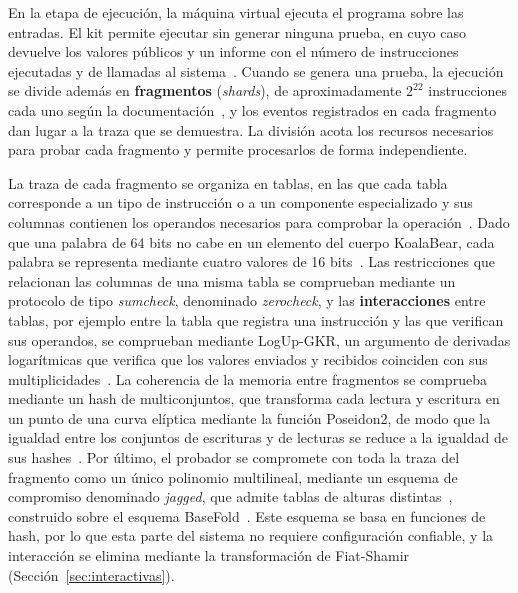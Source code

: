 En la etapa de ejecución, la máquina virtual ejecuta el programa sobre las entradas. El kit
permite ejecutar sin generar ninguna prueba, en cuyo caso devuelve los valores públicos y un
informe con el número de instrucciones ejecutadas y de llamadas al sistema~\cite{sp1repo}. Cuando
se genera una prueba, la ejecución se divide además en \textbf{fragmentos} (\textit{shards}), de
aproximadamente $2^{22}$ instrucciones cada uno según la documentación~\cite{sp1docsv6}, y los
eventos registrados en cada fragmento dan lugar a la traza que se demuestra. La división acota los
recursos necesarios para probar cada fragmento y permite procesarlos de forma independiente.

La traza de cada fragmento se organiza en tablas, en las que cada tabla corresponde a un tipo de
instrucción o a un componente especializado y sus columnas contienen los operandos necesarios para
comprobar la operación~\cite{sp1docsv6}. Dado que una palabra de 64 bits no cabe en un elemento del
cuerpo KoalaBear, cada palabra se representa mediante cuatro valores de 16 bits~\cite{sp1repo}. Las
restricciones que relacionan las columnas de una misma tabla se comprueban mediante un protocolo de
tipo \textit{sumcheck}, denominado \textit{zerocheck}, y las \textbf{interacciones} entre tablas, por
ejemplo entre la tabla que registra una instrucción y las que verifican sus operandos, se comprueban
mediante LogUp-GKR, un argumento de derivadas logarítmicas que verifica que los valores enviados y
recibidos coinciden con sus multiplicidades~\cite{sp1docsv6, papini2023logupgkr}. La coherencia de
la memoria entre fragmentos se comprueba mediante un hash de multiconjuntos, que transforma cada
lectura y escritura en un punto de una curva elíptica mediante la función Poseidon2, de modo que la
igualdad entre los conjuntos de escrituras y de lecturas se reduce a la igualdad de sus
hashes~\cite{sp1docsv6}. Por último, el probador se compromete con toda la traza del fragmento como
un único polinomio multilineal, mediante un esquema de compromiso denominado \textit{jagged}, que
admite tablas de alturas distintas~\cite{hemo2025jagged}, construido sobre el esquema
BaseFold~\cite{zeilberger2023basefold, sp1repo}. Este esquema se basa en funciones de hash, por lo
que esta parte del sistema no requiere configuración confiable, y la interacción se elimina mediante
la transformación de Fiat-Shamir (Sección~\ref{sec:interactivas}).

